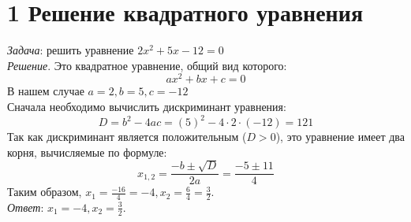 \documentclass[12pt]{article}
\begin{document}
\section*{1 Решение квадратного уравнения}
\textit{Задача}: решить уравнение $2x^2 + 5x - 12 = 0$
\\\indent \textit{Решение}. Это квадратное уравнение, общий вид которого:
$$ax^2 + bx + c = 0$$
В нашем случае $a = 2, b = 5, c = -12$
\\\indent Сначала необходимо вычислить дискриминант уравнения:
$$D = b^2 - 4ac = (5)^2 - 4 \cdot 2 \cdot (-12) = 121$$
Так как дискриминант является положительным ($D > 0$), это уравнение имеет два корня, вычисляемые по формуле:
$$x_{1,2} = \frac{-b \pm \sqrt{D}}{2a} = \frac{-5 \pm 11}{4}$$
Таким образом, $x_1 = \frac{-16}{4} = -4, x_2 = \frac{6}{4} = \frac{3}{2}$.
\\\indent \textit{Ответ}: $x_1 = -4, x_2 = \frac{3}{2}$.
\end{document}
